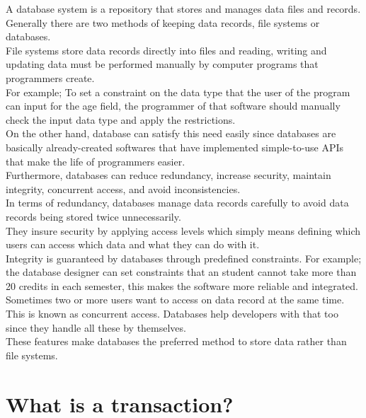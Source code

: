\documentclass[twocolumn,a4paper, 10pt]{article}
\begin{document}
        A database system is a repository that stores and manages data files and records. \\ 
        Generally there are two methods of keeping data records, file systems or databases. \\
        File systems store data records directly into files and reading, writing and updating data 
        must be performed manually by computer programs that programmers create. \\ For example; 
        To set a constraint on the data type that the user of the program can input for the age field,
        the programmer of that software should manually check the input data type and apply the restrictions. \\
        On the other hand, database can satisfy this need easily since databases are basically already-created 
        softwares that have implemented simple-to-use APIs that make the life of programmers easier. \\ 
        Furthermore, databases can reduce redundancy, increase security, maintain integrity, concurrent access, and avoid inconsistencies. \\
        In terms of redundancy, databases manage data records carefully to avoid data records being stored twice unnecessarily. \\
        They insure security by applying access levels which simply means defining which users can access which data and what they can 
        do with it. \\ 
        Integrity is guaranteed by databases through predefined constraints. For example; the database designer can set constraints 
        that an student cannot take more than 20 credits in each semester, this makes the software more reliable and integrated. \\ 
        Sometimes two or more users want to access on data record at the same time. This is known as concurrent access. 
        Databases help developers with that too since they handle all these by themselves. \\ 
        These features make databases the preferred method to store data rather than file systems. \\

    \section{What is a transaction?}
\end{document}
